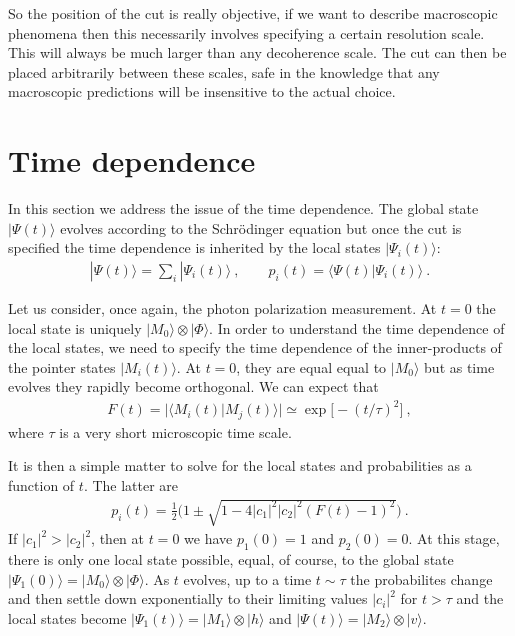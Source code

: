 \documentclass[12pt]{article}
\theoremstyle{plain}
\theoremstyle{definition}
\theoremstyle{remark}
\def\bra#1{\langle #1|}
\def\ket#1{| #1\rangle}
\newcommand{\EQ}[1]{\begin{equation}\begin{split} #1
\end{split}\end{equation}}
\begin{document}
So the position of the cut is really objective, if we want to describe macroscopic phenomena then this necessarily involves
specifying a certain resolution scale. This will always be much larger than any decoherence scale. The cut can then be placed arbitrarily between these scales, safe in the knowledge that any macroscopic predictions will be insensitive to the actual choice.

\section{Time dependence}\label{s6}

In this section we address the issue of the time dependence. The global state $\ket{\Psi(t)}$ evolves according to the Schr\"odinger equation but once the cut is specified the time dependence is inherited by the local states $\ket{\Psi_i(t)}$: 
\EQ{
\ket{\Psi(t)}=\sum_i\ket{\Psi_i(t)}\ ,\qquad p_i(t)=\bra{\Psi(t)}\Psi_i(t)\rangle\ .
}

Let us consider, once again, the photon polarization measurement. At $t=0$ the local state is uniquely $\ket{M_0}\otimes\ket{\Phi}$. In order to understand the time dependence of the local states, we need to specify the time dependence of the inner-products of the pointer states $\ket{M_i(t)}$. At $t=0$, they are equal equal to $\ket{M_0}$ but as time evolves they rapidly become orthogonal. We can expect that
\EQ{
F(t)=\big|\bra{M_i(t)}M_j(t)\rangle\big|\simeq\exp\big[-(t/\tau)^2\big]\ ,
\label{pxx}
}
where $\tau$ is a very short microscopic time scale.

It is then a simple matter to solve for the local states and probabilities as a function of $t$. The latter are
\EQ{
p_i(t)=\frac12\big(1\pm\sqrt{1-4|c_1|^2|c_2|^2(F(t)-1)^2}\big)\ .
}
If $|c_1|^2>|c_2|^2$, then at $t=0$ we have $p_1(0)=1$ and $p_2(0)=0$. At this stage, there is only one local state possible, equal, of course, to the global state $\ket{\Psi_1(0)}=\ket{M_0}\otimes\ket{\Phi}$. As $t$ evolves, up to a time $t\sim\tau$ the probabilites change and then settle down exponentially to their limiting values $|c_i|^2$ for $t>\tau$ and the local states become  $\ket{\Psi_1(t)}=\ket{M_1}\otimes\ket{h}$ and $\ket{\Psi(t)}=\ket{M_2}\otimes\ket{v}$.
\end{document}
